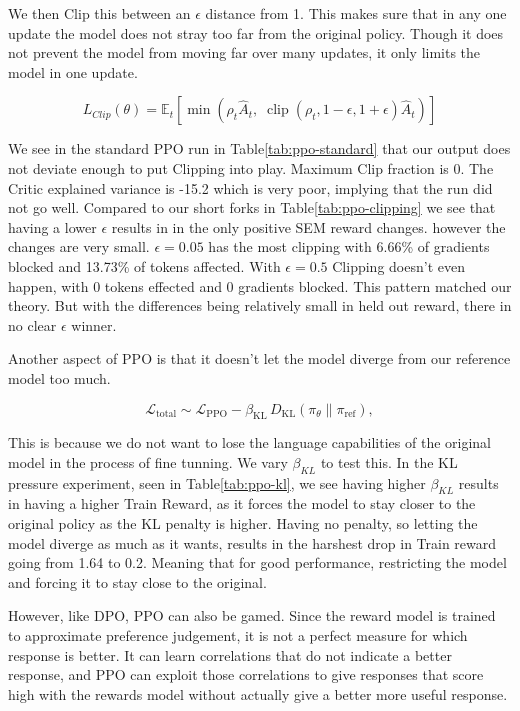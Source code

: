 \documentclass{article}
\begin{document}
We then Clip this between an $\epsilon$ distance from 1. This makes sure that in any one update the model does not stray too far from the original policy. Though it does not
prevent the model from moving far over many updates, it only limits the model in one update.

\[
L_{Clip}(\theta)=
\mathbb{E}_t\left[
\min\left(
\rho_t\hat A_t,\;
\operatorname{clip}(\rho_t,1-\epsilon,1+\epsilon)\hat A_t
\right)
\right]
\]

We see in the standard PPO run in Table\ref{tab:ppo-standard} that our output does not deviate enough to put Clipping into play.
Maximum Clip fraction is 0. The Critic explained variance is -15.2 which is very poor,
implying that the run did not go well. Compared to our short forks in Table\ref{tab:ppo-clipping} we see that having a lower $\epsilon$ results in
in the only positive SEM reward changes. however the changes are very small. $\epsilon = 0.05$ has the most clipping with 6.66\% of gradients blocked and
13.73\% of tokens affected. With $\epsilon = 0.5$ Clipping doesn't even happen, with 0 tokens effected and 0 gradients blocked. This pattern matched our theory.
But with the differences being relatively small in held out reward, there in no clear $\epsilon$ winner.

Another aspect of PPO is that it doesn't let the model diverge from our reference model too much.

\[
\mathcal{L}_{\mathrm{total}}
\sim
\mathcal{L}_{\mathrm{PPO}}
-\beta_{\mathrm{KL}}\,
D_{\mathrm{KL}}(\pi_\theta\|\pi_{\mathrm{ref}}),
\]

This is because we do not want to lose the language capabilities of the original model in the process of fine tunning. We vary $\beta_{KL}$ to test this.
In the KL pressure experiment, seen in Table\ref{tab:ppo-kl}, we see having higher $\beta_{KL}$ results in having a higher Train Reward, as it forces the model to stay closer to the
original policy as the KL penalty is higher. Having no penalty, so letting the model diverge as much as it wants, results in the harshest drop in Train reward going from  1.64 to 0.2.
Meaning that for good performance, restricting the model and forcing it to stay close to the original.

However, like DPO, PPO can also be gamed. Since the reward model is trained to approximate preference judgement, it is not a perfect measure for which response is better.
It can learn correlations that do not indicate a better response, and PPO can exploit those correlations to give responses that score high with the rewards model without actually
give a better more useful response.
\end{document}
